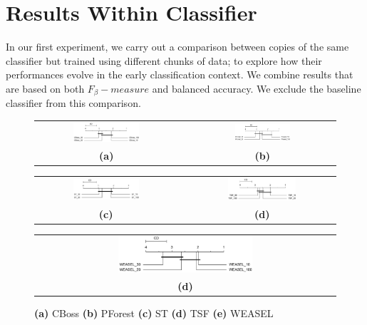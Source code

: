 \section{Results Within Classifier}
\label{SectionWithinComparison}
In our first experiment, we carry out a comparison between copies of the same classifier but trained using different chunks of data;
to explore how their performances evolve in the early classification context. We combine results that are based on both $F_{\beta}-measure$ and balanced accuracy.
We exclude the baseline classifier from this comparison.


\begin{figure} [H]
    \centering
    \begin{tabular}{ccc}
    \includegraphics[width=0.49\textwidth]{cd_hm_within_cboss.png} & & 
    \includegraphics[width=0.40\textwidth]{cd_hm_within_pforest.png} \\
    \textbf{(a)} & & \textbf{(b)} \\[6pt]
    \end{tabular}
    \begin{tabular}{ccc}
    \includegraphics[width=0.49\textwidth]{cd_hm_within_st.png} & & 
    \includegraphics[width=0.49\textwidth]{cd_hm_within_tsf.png} \\
    \textbf{(c)} & & \textbf{(d)}  \\[6pt]
    \end{tabular}
    \begin{tabular}{ccc}
    & \includegraphics[width=0.49\textwidth]{cd_hm_within_weasel.png} & \\
    & \textbf{(d)} & \\[6pt]
    \end{tabular}
    \caption{ \textbf{(a)} CBoss
    \textbf{(b)} PForest
    \textbf{(c)} ST
    \textbf{(d)} TSF
    \textbf{(e)} WEASEL}
    \label{fig:within}
\end{figure}



